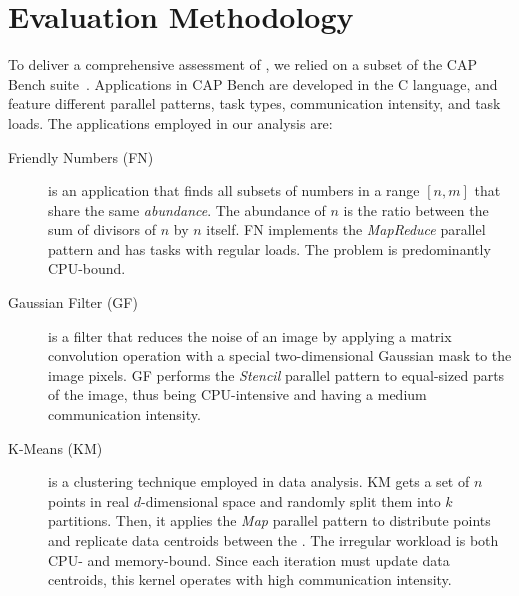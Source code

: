\section{Evaluation Methodology}
\label{sec:evaluation-methodology}

	To deliver a comprehensive assessment of \lwmpi, we relied on a
	subset of the CAP Bench suite~\cite{Souza2017}.
	Applications in CAP Bench are developed in the C language, and feature
	different parallel patterns, task types, communication intensity, and
	task loads. The applications employed in our analysis are:
	\begin{description}
		\item[Friendly Numbers (FN)] is an application that finds all
			subsets of numbers in a range $[n,m]$ that share the same
			\textit{abundance}. The abundance of $n$ is the ratio
			between the sum of divisors of $n$ by $n$ itself. FN
			implements the \textit{MapReduce} parallel pattern and has
			tasks with regular loads. The problem is predominantly
			CPU-bound.

		\item[Gaussian Filter (GF)] is a filter that reduces the noise
			of an image by applying a matrix convolution operation with
			a special two-dimensional Gaussian mask to the image pixels.
			GF performs the \textit{Stencil} parallel pattern to
			equal-sized parts of the image, thus being CPU-intensive and
			having a medium communication intensity.

		\item[K-Means (KM)] is a clustering technique employed in
			data analysis. KM gets a set of $n$ points in real
			$d$-dimensional space and randomly split them into $k$
			partitions. Then, it applies the \textit{Map} parallel
			pattern to distribute points and replicate data centroids
			between the \cclusters. The irregular workload is both CPU-
			and memory-bound. Since each iteration must update data
			centroids, this kernel operates with high communication
			intensity.
	\end{description}

